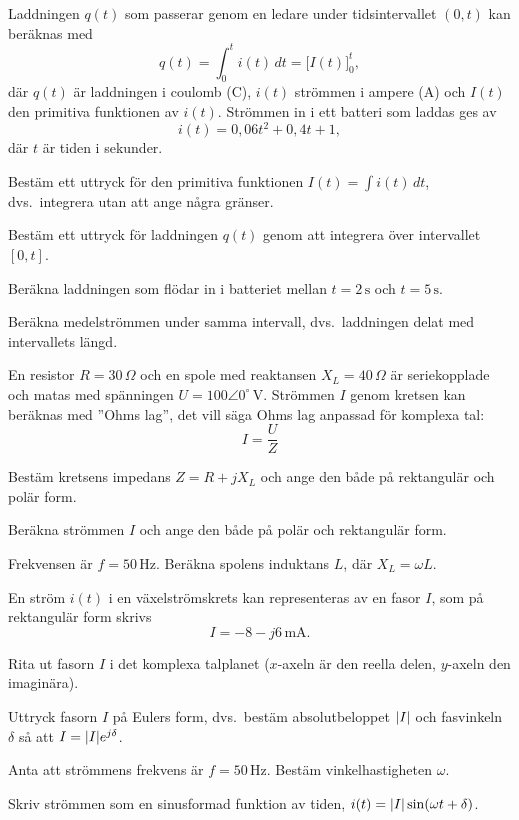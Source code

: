 Laddningen $q(t)$ som passerar genom en ledare under tidsintervallet $(0, t)$ kan beräknas med
\[
  q(t) = \int_0^t i(t)\,dt = \bigl[I(t)\bigr]_0^t,
\]
där $q(t)$ är laddningen i coulomb (C), $i(t)$ strömmen i ampere (A) och $I(t)$ den primitiva
funktionen av $i(t)$. Strömmen in i ett batteri som laddas ges av
\[
  i(t) = 0{,}06t^2 + 0{,}4t + 1,
\]
där $t$ är tiden i sekunder.
\begin{parts}
  \item Bestäm ett uttryck för den primitiva funktionen $I(t) = \int i(t)\,dt$, dvs.\ integrera
    utan att ange några gränser.
  \item Bestäm ett uttryck för laddningen $q(t)$ genom att integrera över intervallet $[0, t]$.
  \item Beräkna laddningen som flödar in i batteriet mellan $t = 2\,\text{s}$ och
    $t = 5\,\text{s}$.
  \item Beräkna medelströmmen under samma intervall, dvs.\ laddningen delat med intervallets
    längd.
\end{parts}

En resistor $R = 30\,\Omega$ och en spole med reaktansen $X_L = 40\,\Omega$ är seriekopplade och
matas med spänningen $U = 100\angle 0^{\circ}\,\text{V}$. Strömmen $I$ genom kretsen kan beräknas
med ”Ohms lag”, det vill säga Ohms lag anpassad för komplexa tal:
\[
  I = \frac{U}{Z}
\]
\begin{parts}
  \item Bestäm kretsens impedans $Z = R + jX_L$ och ange den både på rektangulär och polär form.
  \item Beräkna strömmen $I$ och ange den både på polär och rektangulär form.
  \item Frekvensen är $f = 50\,\text{Hz}$. Beräkna spolens induktans $L$, där $X_L = \omega L$.
\end{parts}

En ström $i(t)$ i en växelströmskrets kan representeras av en fasor $I$, som på rektangulär form
skrivs
\[
  I = -8 - j6\,\text{mA}.
\]
\begin{parts}
  \item Rita ut fasorn $I$ i det komplexa talplanet ($x$-axeln är den reella delen, $y$-axeln den
    imaginära).
  \item Uttryck fasorn $I$ på Eulers form, dvs.\ bestäm absolutbeloppet $\lvert I\rvert$ och fasvinkeln
    $\delta$ så att $I = \lvert I\rvert e^{j\delta}$.
  \item Anta att strömmens frekvens är $f = 50\,\text{Hz}$. Bestäm vinkelhastigheten $\omega$.
  \item Skriv strömmen som en sinusformad funktion av tiden, $i(t) = \lvert I\rvert\sin(\omega t + \delta)$.
\end{parts}

